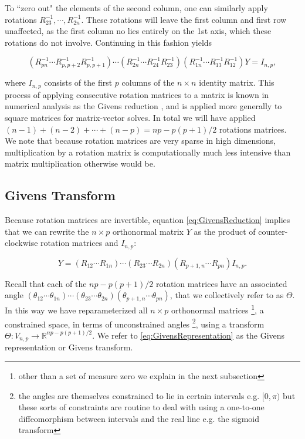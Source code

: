 \documentclass{article}
\begin{document}
To ``zero out" the elements of the second column, one can similarly apply rotations $R_{23}^{-1}, \cdots, R_{2n}^{-1}$. These rotations will leave the first column and first row unaffected, as the first column no lies entirely on the 1st axis, which these rotations do not involve. Continuing in this fashion yields

\begin{equation}
\label{eq:GivensReduction}
(R_{pn}^{-1} \cdots R_{p,p+2}^{-1} R_{p,p+1}^{-1}) \cdots (R_{2n}^{-1} \cdots R_{24}^{-1} R_{23}^{-1})(R_{1n}^{-1} \cdots R_{13}^{-1}  R_{12}^{-1})Y = I_{n,p},
\end{equation}

where $I_{n,p}$ consists of the first $p$ columns of the $n \times n$ identity matrix. This process of applying consecutive rotation matrices to a matrix is known in numerical analysis as the Givens reduction \citep{meyer2000matrix}, and is applied more generally to square matrices for matrix-vector solves. In total we will have applied $(n-1)+(n-2)+\cdots+(n-p) = np -p(p+1)/2$ rotations matrices. We note that because rotation matrices are very sparse in high dimensions, multiplication by a rotation matrix is computationally much less intensive than matrix multiplication otherwise would be.

\subsection{Givens Transform}
Because rotation matrices are invertible, equation \ref{eq:GivensReduction} implies that we can rewrite the $n \times p$ orthonormal matrix $Y$ as the product of counter-clockwise rotation matrices and $I_{n,p}$:

\begin{equation}
\label{eq:GivensRepresentation}
Y = (R_{12} \cdots R_{1n}) \cdots (R_{23} \cdots R_{2n}) (R_{p+1,n} \cdots R_{pn}) I_{n,p}.
\end{equation}

Recall that each of the $np -p(p+1)/2$ rotation matrices have an associated  angle $(\theta_{12} \cdots \theta_{1n}) \cdots (\theta_{23} \cdots \theta_{2n}) (\theta_{p+1,n} \cdots \theta_{pn})$, that we collectively refer to as $\Theta$. In this way we have reparameterized all $n \times p$ orthonormal matrices \footnote{other than a set of measure zero we explain in the next subsection}, a constrained space, in terms of unconstrained angles \footnote{the angles are themselves constrained to lie in certain intervals e.g. $[0, \pi)$ but these sorts of constraints are routine to deal with using a one-to-one diffeomorphism between intervals and the real line e.g. the sigmoid transform}, using a transform $\Theta: V_{n,p} \to \mathbb{R}^{np -p(p+1)/2}$. We refer to \ref{eq:GivensRepresentation} as the Givens representation or Givens transform.
\end{document}
